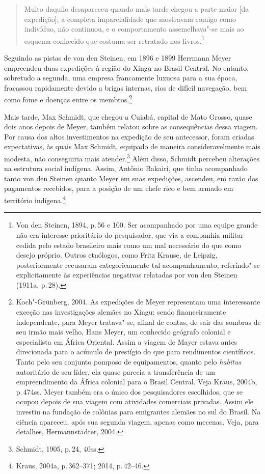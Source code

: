 \begin{quote}Muito daquilo desapareceu quando mais tarde chegou a parte
maior {[}da expedição{]}; a completa imparcialidade que mostravam
comigo como indivíduo, não continuou, e o comportamento assemelhava"-se
mais ao esquema conhecido que costuma ser retratado nos
livros.\footnote{Von den Steinen, 1894, p.\,56 e 100.
Ser acompanhado por uma equipe grande não era
  interesse prioritário do pesquisador, que via a companhia militar
  cedida pelo estado brasileiro mais como um mal necessário do que como
  desejo próprio. Outros etnólogos, como Fritz Krause, de Leipzig,
  posteriormente recusaram categoricamente tal acompanhamento,
  referindo"-se explicitamente às experiências negativas relatadas por
  von den Steinen (1911a, p.\,28).}
\end{quote}

Seguindo as pistas de von den Steinen, em 1896 e 1899 Herrmann Meyer
empreendeu duas expedições à região do Xingu no Brasil
Central. No entanto, sobretudo a segunda, uma empresa francamente
luxuosa para a sua época, fracassou rapidamente devido a brigas
internas, rios de difícil navegação, bem como fome e doenças entre os
membros.\footnote{Koch"-Grünberg, 2004. As expedições de Meyer
  representam uma interessante exceção nas investigações alemães no
  Xingu: sendo financeiramente independente, para Meyer tratava"-se,
  afinal de contas, de sair das sombras de seu irmão mais velho, Hans
  Meyer, um conhecido geógrafo colonial e especialista em África
  Oriental. Assim a viagem de Mayer estava antes direcionada para o
  acúmulo de prestígio do que para rendimentos científicos. Tanto pelo
  seu conjunto pomposo de equipamentos, quanto pelo \textit{habitus}
  autoritário de seu líder, ela quase parecia a transferência de um
  empreendimento da África colonial para o Brasil Central. Veja Kraus,
  2004b, p.\,474ss. Meyer também era o único dos pesquisadores
  escolhidos, que se ocupou depois de sua viagem com atividades
  comerciais privadas. Assim ele investiu na fundação de colônias para
  emigrantes alemães no sul do Brasil. Na ciência apareceu, após sua
  segunda viagem, apenas como mecenas. Veja, para detalhes,
  Hermannstädter, 2004.}

Mais tarde, Max Schmidt, que chegou a Cuiabá, capital de Mato Grosso,
quase dois anos depois de Meyer, também relatou sobre as consequências
dessa viagem. Por causa dos altos investimentos na expedição de seu
antecessor, foram criadas expectativas, às quais Max Schmidt, equipado
de maneira consideravelmente mais modesta, não conseguiria mais atender.\footnote{Schmidt, 1905, p.\,24, 40ss.} Além disso, Schmidt percebeu alterações
na estrutura social indígena. Assim, Antônio Bakairi, que tinha
acompanhado tanto von den Steinen quanto Meyer em suas expedições,
ascendeu, em razão dos pagamentos recebidos, para a posição de um chefe
rico e bem armado em território indígena.\footnote{Kraus, 2004a, p.\,362--371; 2014, p.\,42--46.}


